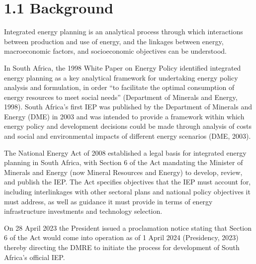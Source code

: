\documentclass[letterpaper,10pt,english]{jupyterBook}
\begin{document}
\section{1.1 Background}
\label{\detokenize{01Introduction:background}}
\sphinxAtStartPar
Integrated energy planning is an analytical process through which interactions between production and use of energy, and the linkages between energy, macro\sphinxhyphen{}economic factors, and socio\sphinxhyphen{}economic objectives can be understood.

\sphinxAtStartPar
In South Africa, the 1998 White Paper on Energy Policy identified integrated energy planning as a key analytical framework for undertaking energy policy analysis and formulation, in order “to facilitate the optimal consumption of energy resources to meet social needs” (Department of Minerals and Energy, 1998). South Africa’s first IEP was published by the Department of Minerals and Energy (DME) in 2003 and was intended to provide a framework within which energy policy and development decisions could be made through analysis of costs and social and environmental impacts of different energy scenarios (DME, 2003).

\sphinxAtStartPar
The National Energy Act of 2008 established a legal basis for integrated energy planning in South Africa, with Section 6 of the Act mandating the Minister of Minerals and Energy (now Mineral Resources and Energy) to develop, review, and publish the IEP. The Act specifies objectives that the IEP must account for, including interlinkages with other sectoral plans and national policy objectives it must address, as well as guidance it must provide in terms of energy infrastructure investments and technology selection.

\sphinxAtStartPar
On 28 April 2023 the President issued a proclamation notice stating that Section 6 of the Act would come into operation as of 1 April 2024 (Presidency, 2023) thereby directing the DMRE to initiate the process for development of South Africa’s official IEP.
\end{document}
